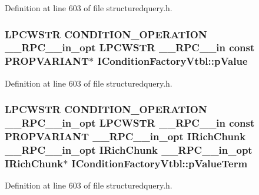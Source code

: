 Definition at line 603 of file structuredquery.\+h.

\subsubsection[{\texorpdfstring{p\+Value}{pValue}}]{ {\bf L\+P\+C\+W\+S\+TR} {\bf C\+O\+N\+D\+I\+T\+I\+O\+N\+\_\+\+O\+P\+E\+R\+A\+T\+I\+ON} {\bf \+\_\+\+\_\+\+R\+P\+C\+\_\+\+\_\+in\+\_\+opt} {\bf L\+P\+C\+W\+S\+TR} {\bf \+\_\+\+\_\+\+R\+P\+C\+\_\+\+\_\+in} {\bf const} {\bf P\+R\+O\+P\+V\+A\+R\+I\+A\+NT}$\ast$ I\+Condition\+Factory\+Vtbl\+::p\+Value}\hypertarget{struct_i_condition_factory_vtbl_a49bd18af546ce4b0e172c9829b1c3d0a}{}\label{struct_i_condition_factory_vtbl_a49bd18af546ce4b0e172c9829b1c3d0a}


Definition at line 603 of file structuredquery.\+h.

\subsubsection[{\texorpdfstring{p\+Value\+Term}{pValueTerm}}]{ {\bf L\+P\+C\+W\+S\+TR} {\bf C\+O\+N\+D\+I\+T\+I\+O\+N\+\_\+\+O\+P\+E\+R\+A\+T\+I\+ON} {\bf \+\_\+\+\_\+\+R\+P\+C\+\_\+\+\_\+in\+\_\+opt} {\bf L\+P\+C\+W\+S\+TR} {\bf \+\_\+\+\_\+\+R\+P\+C\+\_\+\+\_\+in} {\bf const} {\bf P\+R\+O\+P\+V\+A\+R\+I\+A\+NT} {\bf \+\_\+\+\_\+\+R\+P\+C\+\_\+\+\_\+in\+\_\+opt} {\bf I\+Rich\+Chunk} {\bf \+\_\+\+\_\+\+R\+P\+C\+\_\+\+\_\+in\+\_\+opt} {\bf I\+Rich\+Chunk} {\bf \+\_\+\+\_\+\+R\+P\+C\+\_\+\+\_\+in\+\_\+opt} {\bf I\+Rich\+Chunk}$\ast$ I\+Condition\+Factory\+Vtbl\+::p\+Value\+Term}\hypertarget{struct_i_condition_factory_vtbl_a421cc43174cc067e0c839e3ed7fa3104}{}\label{struct_i_condition_factory_vtbl_a421cc43174cc067e0c839e3ed7fa3104}


Definition at line 603 of file structuredquery.\+h.

